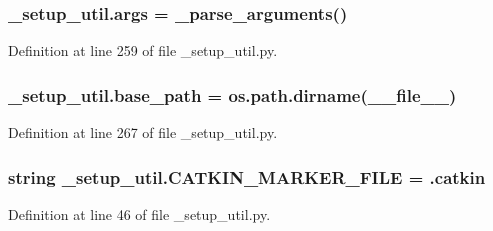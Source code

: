 \subsubsection[{\texorpdfstring{args}{args}}]{\setlength{\rightskip}{0pt plus 5cm}\+\_\+setup\+\_\+util.\+args = \+\_\+parse\+\_\+arguments()}\hypertarget{namespace__setup__util_a547963d07c6371df1c51b1384a2dec28}{}\label{namespace__setup__util_a547963d07c6371df1c51b1384a2dec28}


Definition at line 259 of file \+\_\+setup\+\_\+util.\+py.

\subsubsection[{\texorpdfstring{base\+\_\+path}{base_path}}]{\setlength{\rightskip}{0pt plus 5cm}\+\_\+setup\+\_\+util.\+base\+\_\+path = os.\+path.\+dirname(\+\_\+\+\_\+file\+\_\+\+\_\+)}\hypertarget{namespace__setup__util_a83d25140acd7788bbcb95843fe38e639}{}\label{namespace__setup__util_a83d25140acd7788bbcb95843fe38e639}


Definition at line 267 of file \+\_\+setup\+\_\+util.\+py.

\subsubsection[{\texorpdfstring{C\+A\+T\+K\+I\+N\+\_\+\+M\+A\+R\+K\+E\+R\+\_\+\+F\+I\+LE}{CATKIN_MARKER_FILE}}]{\setlength{\rightskip}{0pt plus 5cm}string \+\_\+setup\+\_\+util.\+C\+A\+T\+K\+I\+N\+\_\+\+M\+A\+R\+K\+E\+R\+\_\+\+F\+I\+LE = \textquotesingle{}.catkin\textquotesingle{}}\hypertarget{namespace__setup__util_a3fa0ca5a460a71a43cbc3d4954ab1f10}{}\label{namespace__setup__util_a3fa0ca5a460a71a43cbc3d4954ab1f10}


Definition at line 46 of file \+\_\+setup\+\_\+util.\+py.

